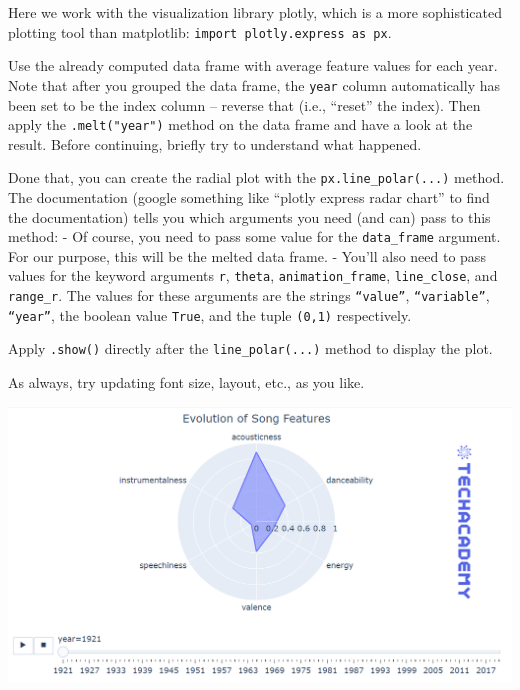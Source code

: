 \documentclass[
  11pt,
]{book}
\newenvironment{tipsp}[1]
  {
  \begin{itemize}
  \footnotesize
  \renewcommand{\labelitemi}{
    \raisebox{-.7\height}[0pt][0pt]{
      {\setkeys{Gin}{width=3em,keepaspectratio}
        \texttt{[image: images/\#1.png]}}
    }
  }
  \setlength{\fboxsep}{1em}
  \begin{pbox}
  \item
  }
  {
  \end{pbox}
  \end{itemize}
  }
\begin{document}
\begin{tipsp}p

Here we work with the visualization library plotly, which is a more sophisticated plotting tool than matplotlib:
\texttt{import\ plotly.express\ as\ px}.

Use the already computed data frame with average feature values for each year. Note that after you grouped the data frame, the \texttt{year} column automatically has been set to be the index column -- reverse that (i.e., ``reset'' the index).
Then apply the \texttt{.melt("year")} method on the data frame and have a look at the result. Before continuing, briefly try to understand what happened.

Done that, you can create the radial plot with the \texttt{px.line\_polar(...)} method. The documentation (google something like ``plotly express radar chart'' to find the documentation) tells you which arguments you need (and can) pass to this method:
- Of course, you need to pass some value for the \texttt{data\_frame} argument. For our purpose, this will be the melted data frame.
- You'll also need to pass values for the keyword arguments \texttt{r}, \texttt{theta}, \texttt{animation\_frame}, \texttt{line\_close}, and \texttt{range\_r}.
The values for these arguments are the strings \texttt{“value”}, \texttt{“variable”}, \texttt{“year”}, the boolean value \texttt{True}, and the tuple \texttt{(0,1)} respectively.

Apply \texttt{.show()} directly after the \texttt{line\_polar(...)} method to display the plot.

As always, try updating font size, layout, etc., as you like.

\end{tipsp}

\begin{center}\includegraphics[width=1\linewidth]{splots/features_over_time_advanced} \end{center}
\end{document}
